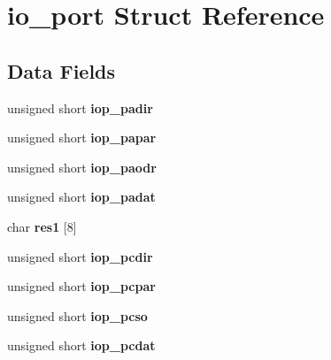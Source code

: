 \hypertarget{structio__port}{}\section{io\+\_\+port Struct Reference}
\label{structio__port}
\subsection*{Data Fields}
\begin{DoxyCompactItemize}
\item 
\mbox{\label{structio__port_aca96f483eed63d27c4d16b91bbaef900}} 
unsigned short {\bfseries iop\+\_\+padir}
\item 
\mbox{\label{structio__port_afcd4dc243f6917928dba66c5405142bf}} 
unsigned short {\bfseries iop\+\_\+papar}
\item 
\mbox{\label{structio__port_a405999da7224d3bb20360d65995a7df2}} 
unsigned short {\bfseries iop\+\_\+paodr}
\item 
\mbox{\label{structio__port_a53ebb7258678631f45b217e8872b3681}} 
unsigned short {\bfseries iop\+\_\+padat}
\item 
\mbox{\label{structio__port_a752d89a50bd771ff8e0a3ab81cfa33b6}} 
char {\bfseries res1} \mbox{[}8\mbox{]}
\item 
\mbox{\label{structio__port_a8022380280c6f2b82af7cd5abab79164}} 
unsigned short {\bfseries iop\+\_\+pcdir}
\item 
\mbox{\label{structio__port_a942ddbb6641370f3dab75eb02e85307c}} 
unsigned short {\bfseries iop\+\_\+pcpar}
\item 
\mbox{\label{structio__port_a3f6438415dcf9ef55016390760e946c9}} 
unsigned short {\bfseries iop\+\_\+pcso}
\item 
\mbox{\label{structio__port_a4a02c8dd943de944ce55bd7011943de2}} 
unsigned short {\bfseries iop\+\_\+pcdat}
\item 
\mbox{\label{structio__port_a5e12377b42234de315cabbc2334bf9cb}} 

\end{DoxyCompactItemize}
